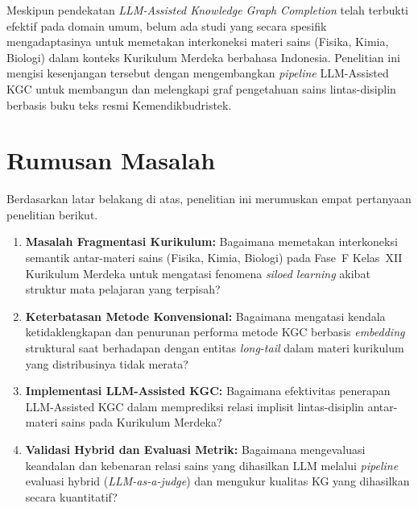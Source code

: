 \documentclass[main]{subfiles}
\begin{document}
Meskipun pendekatan \textit{LLM-Assisted Knowledge Graph Completion} telah
terbukti efektif pada domain umum, belum ada studi yang secara spesifik
mengadaptasinya untuk memetakan interkoneksi materi sains (Fisika, Kimia,
Biologi) dalam konteks Kurikulum Merdeka berbahasa Indonesia. Penelitian ini
mengisi kesenjangan tersebut dengan mengembangkan \textit{pipeline}
LLM-Assisted KGC untuk membangun dan melengkapi graf pengetahuan sains
lintas-disiplin berbasis buku teks resmi Kemendikbudristek.

\section{Rumusan Masalah}

Berdasarkan latar belakang di atas, penelitian ini merumuskan empat pertanyaan
penelitian berikut.

\begin{enumerate}
  \item \textbf{Masalah Fragmentasi Kurikulum:} Bagaimana memetakan
        interkoneksi semantik antar-materi sains (Fisika, Kimia, Biologi) pada
        Fase~F Kelas~XII Kurikulum Merdeka untuk mengatasi fenomena
        \textit{siloed learning} akibat struktur mata pelajaran yang terpisah?

  \item \textbf{Keterbatasan Metode Konvensional:} Bagaimana mengatasi kendala
        ketidaklengkapan dan penurunan performa metode KGC berbasis
        \textit{embedding} struktural saat berhadapan dengan entitas
        \textit{long-tail} dalam materi kurikulum yang distribusinya tidak merata?

  \item \textbf{Implementasi LLM-Assisted KGC:} Bagaimana efektivitas penerapan
        LLM-Assisted KGC dalam memprediksi relasi implisit lintas-disiplin
        antar-materi sains pada Kurikulum Merdeka?

  \item \textbf{Validasi Hybrid dan Evaluasi Metrik:} Bagaimana mengevaluasi
        keandalan dan kebenaran relasi sains yang dihasilkan LLM melalui
        \textit{pipeline} evaluasi hybrid (\textit{LLM-as-a-judge}) dan mengukur
        kualitas KG yang dihasilkan secara kuantitatif?
\end{enumerate}

\end{document}
